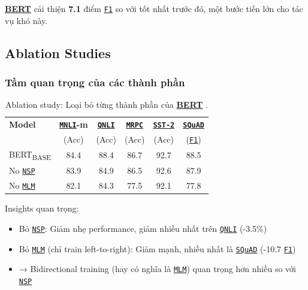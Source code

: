 \hyperref[acro:bert]{\textbf{BERT}} cải thiện \textbf{7.1} điểm \hyperref[acro:f1]{\texttt{F1}} so với tốt nhất trước đó, một bước tiến lớn cho tác vụ khó này.

\subsection{Ablation Studies}
\label{ssec:ablation_study_bert}

\subsubsection{Tầm quan trọng của các thành phần}
\begin{table}[H]
    \centering
    \caption{Ablation study: Loại bỏ từng thành phần của \hyperref[acro:bert]{\textbf{BERT}} \cite{devlin2018bert}.}
    \label{tab:ablation_components}
    \begin{tabular}{lccccc}
        \toprule
        \textbf{Model} & \textbf{\hyperref[acro:mnli]{\texttt{MNLI}}-m} & \textbf{\hyperref[acro:qnli]{\texttt{QNLI}}} & \textbf{\hyperref[acro:mrpc]{\texttt{MRPC}}} & \textbf{\hyperref[acro:sst2]{\texttt{SST-2}}} & \textbf{\hyperref[acro:squad]{\texttt{SQuAD}}} \\
        & (Acc) & (Acc) & (Acc) & (Acc) & (\hyperref[acro:f1]{\texttt{F1}}) \\
        \midrule
        BERT\textsubscript{BASE} & 84.4 & 88.4 & 86.7 & 92.7 & 88.5 \\
        \midrule
        No \hyperref[acro:nsp]{\texttt{NSP}} & 83.9 & 84.9 & 86.5 & 92.6 & 87.9 \\
        No \hyperref[acro:mlm]{\texttt{MLM}} & 82.1 & 84.3 & 77.5 & 92.1 & 77.8 \\
        \bottomrule
    \end{tabular}
\end{table}

Insights quan trọng:
\begin{itemize}
    \item Bỏ \hyperref[acro:nsp]{\texttt{NSP}}: Giảm nhẹ performance, giảm nhiều nhất trên \hyperref[acro:qnli]{\texttt{QNLI}} (-3.5\%)
    \item Bỏ \hyperref[acro:mlm]{\texttt{MLM}} (chỉ train left-to-right): Giảm mạnh, nhiều nhất là \hyperref[acro:squad]{\texttt{SQuAD}} (-10.7 \hyperref[acro:f1]{\texttt{F1}})
    \item → Bidirectional training (hay có nghĩa là \hyperref[acro:mlm]{\texttt{MLM}}) quan trọng hơn nhiều so với \hyperref[acro:nsp]{\texttt{NSP}}
\end{itemize}

